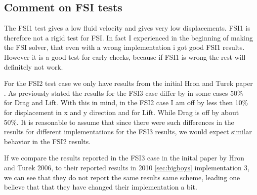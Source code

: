 \subsection*{Comment on FSI tests}
The FSI1 test gives a low fluid velocity and gives very low displacements. FSI1 is therefore not a rigid test for FSI. In fact I experienced in the beginning of making the FSI solver, that even with a wrong implementation i got good FSI1 results. However it is a good test for early checks, because if FSI1 is wrong the rest will definitely not work.  \newline

For the FSI2 test case we only have results from the initial Hron and Turek paper \cite{Hron2006a}. As previously stated the results for the FSI3 case differ by in some cases 50\% for Drag and Lift. With this in mind, in the FSI2 case I am off by less then 10\% for displacement in x and y direction and for Lift. While Drag is off by about  50\%. It is reasonable to assume that since there were such differences in the results for different implementations for the FSI3 results, we would expect similar behavior in the FSI2 results.

If we compare the results reported in the FSI3 case in the inital paper by Hron and Turek 2006, to their reported results in 2010 \ref{sec:bigboys} implementation 3, we can see that they do not report the same results same scheme, leading one believe that that they have changed their implementation a bit. 

